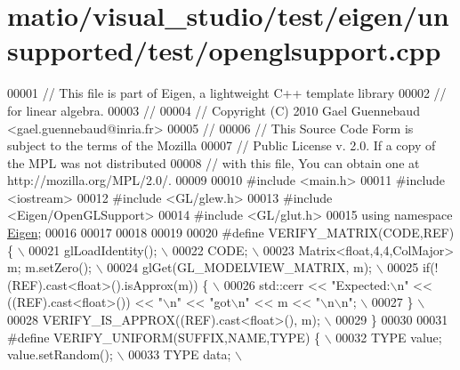 \hypertarget{matio_2visual__studio_2test_2eigen_2unsupported_2test_2openglsupport_8cpp_source}{}\section{matio/visual\+\_\+studio/test/eigen/unsupported/test/openglsupport.cpp}
\label{matio_2visual__studio_2test_2eigen_2unsupported_2test_2openglsupport_8cpp_source}

\begin{DoxyCode}
00001 \textcolor{comment}{// This file is part of Eigen, a lightweight C++ template library}
00002 \textcolor{comment}{// for linear algebra.}
00003 \textcolor{comment}{//}
00004 \textcolor{comment}{// Copyright (C) 2010 Gael Guennebaud <gael.guennebaud@inria.fr>}
00005 \textcolor{comment}{//}
00006 \textcolor{comment}{// This Source Code Form is subject to the terms of the Mozilla}
00007 \textcolor{comment}{// Public License v. 2.0. If a copy of the MPL was not distributed}
00008 \textcolor{comment}{// with this file, You can obtain one at http://mozilla.org/MPL/2.0/.}
00009 
00010 \textcolor{preprocessor}{#include <main.h>}
00011 \textcolor{preprocessor}{#include <iostream>}
00012 \textcolor{preprocessor}{#include <GL/glew.h>}
00013 \textcolor{preprocessor}{#include <Eigen/OpenGLSupport>}
00014 \textcolor{preprocessor}{#include <GL/glut.h>}
00015 \textcolor{keyword}{using namespace }\hyperlink{namespace_eigen}{Eigen};
00016 
00017 
00018 
00019 
00020 \textcolor{preprocessor}{#define VERIFY\_MATRIX(CODE,REF) \{ \(\backslash\)}
00021 \textcolor{preprocessor}{    glLoadIdentity(); \(\backslash\)}
00022 \textcolor{preprocessor}{    CODE; \(\backslash\)}
00023 \textcolor{preprocessor}{    Matrix<float,4,4,ColMajor> m; m.setZero(); \(\backslash\)}
00024 \textcolor{preprocessor}{    glGet(GL\_MODELVIEW\_MATRIX, m); \(\backslash\)}
00025 \textcolor{preprocessor}{    if(!(REF).cast<float>().isApprox(m)) \{ \(\backslash\)}
00026 \textcolor{preprocessor}{      std::cerr << "Expected:\(\backslash\)n" << ((REF).cast<float>()) << "\(\backslash\)n" << "got\(\backslash\)n" << m << "\(\backslash\)n\(\backslash\)n"; \(\backslash\)}
00027 \textcolor{preprocessor}{    \} \(\backslash\)}
00028 \textcolor{preprocessor}{    VERIFY\_IS\_APPROX((REF).cast<float>(), m); \(\backslash\)}
00029 \textcolor{preprocessor}{  \}}
00030 
00031 \textcolor{preprocessor}{#define VERIFY\_UNIFORM(SUFFIX,NAME,TYPE) \{ \(\backslash\)}
00032 \textcolor{preprocessor}{    TYPE value; value.setRandom(); \(\backslash\)}
00033 \textcolor{preprocessor}{    TYPE data; \(\backslash\)}

\end{DoxyCode}
